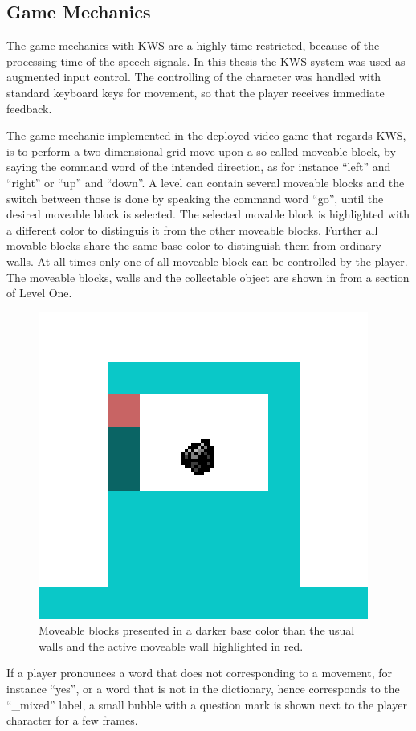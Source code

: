 
\subsection{Game Mechanics}\label{sec:game_design_mechanics}
The game mechanics with KWS are a highly time restricted, because of the processing time of the speech signals.
In this thesis the KWS system was used as augmented input control.
The controlling of the character was handled with standard keyboard keys for movement, so that the player receives immediate feedback. 

The game mechanic implemented in the deployed video game that regards KWS, is to perform a two dimensional grid move upon a so called moveable block, by saying the command word of the intended direction, as for instance \enquote{left} and \enquote{right} or \enquote{up} and \enquote{down}.
A level can contain several moveable blocks and the switch between those is done by speaking the command word \enquote{go}, until the desired moveable block is selected.
The selected movable block is highlighted with a different color to distinguis it from the other moveable blocks.
Further all movable blocks share the same base color to distinguish them from ordinary walls.
At all times only one of all moveable block can be controlled by the player.
The moveable blocks, walls and the collectable object are shown in  from a section of Level One.
\begin{figure}[!ht]
  \centering
  \includegraphics[height=0.25\textwidth]{./6_game/figs/game_design_mechanic_thing}
  \caption{Moveable blocks presented in a darker base color than the usual walls and the active moveable wall highlighted in red.}
  \label{fig:game_design_mechanic_thing}
\end{figure}
\FloatBarrier
\noindent
If a player pronounces a word that does not corresponding to a movement, for instance \enquote{yes}, or a word that is not in the dictionary, hence corresponds to the \enquote{\_mixed} label, a small bubble with a question mark is shown next to the player character for a few frames.
